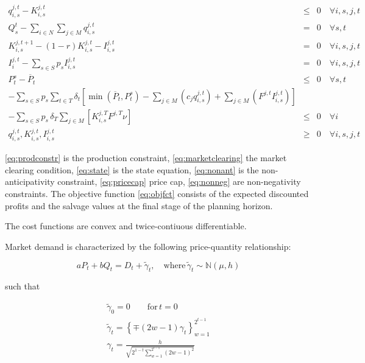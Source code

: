 \begin{eqnarray}  
q_{i,s}^{j,t} - K_{i,s}^{j,t} &\leq& 0 \quad \forall i,s,j,t \label{eq:prodconstr} \\
Q_s^t-\sum_{i\in N}\sum_{j\in M} q_{i,s}^{j,t} &=& 0 \quad \forall s,t \label{eq:marketclearing}\\
K_{i,s}^{j,t+1} - (1-r)K_{i,s}^{j,t}-I_{i,s}^{j,t} &=& 0 \quad \forall i,s,j,t \label{eq:state} \\
I_{i}^{j,t}-\sum_{s\in S}p_sI_{i,s}^{j,t} &=& 0 \quad \forall i,s,j,t \label{eq:nonant}\\
P_t^s - \overline{P}_t &\leq& 0 \quad \forall s,t \label{eq:pricecap}\\
-\sum_{s\in S}p_s \sum_{t\in T}\delta_t\left[\min\left(\overline{P}_t,P_t^s\right) -\sum_{j\in M}\left(c_jq_{i,s}^{j,t}\right)+\sum_{j\in M}\left(F^{j,t}I_{i,s}^{j,t}\right)\right]\nonumber\\
  -\sum_{s\in S}p_s\,\delta_T \sum_{j\in M}\left[K_{i,s}^{j,T}F^{j,T}\nu\right] &\leq& 0 \quad \forall i\\
q_{i,s}^{j,t}, K_{i,s}^{j,t}, I_{i,s}^{j,t}  &\geq& 0 \quad \forall i,s,j,t\label{eq:nonneg}
\end{eqnarray}

\eqref{eq:prodconstr} is the production constraint, \eqref{eq:marketclearing} the market clearing condition, \eqref{eq:state} is the state equation, \eqref{eq:nonant} is the non-anticipativity constraint, \eqref{eq:pricecap} price cap, \eqref{eq:nonneg} are non-negativity constraints. The objective function \eqref{eq:objfct} consists of the expected discounted profits and the salvage values at the final stage of the planning horizon.

The cost functions are convex and twice-contiuous differentiable.

Market demand is characterized by the following price-quantity relationship:

\begin{equation}
  \label{eq:marketdemandpq}
  aP_t+bQ_t=D_t+\tilde{\gamma}_t, \quad \mbox{where}\, \tilde{\gamma}_t\sim\mathbb{N}(\mu,h)
\end{equation}

such that

\begin{eqnarray*}
  \label{eq:3}
  \tilde{\gamma}_0=0\qquad\mbox{for}\, t=0\\
   \tilde{\gamma}_t=\left\{\mp(2w-1)\gamma_t\right\}_{w=1}^{2^{t-1}}\\
   \gamma_t=\frac{h}{\sqrt{2^{1-t}\sum_{w=1}^{2^{t-1}}(2w-1)^2}}
\end{eqnarray*}

